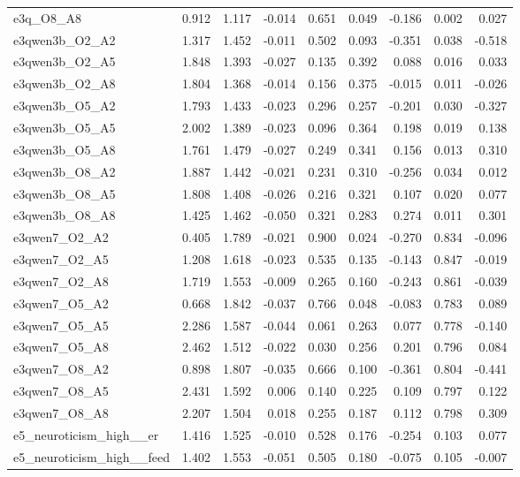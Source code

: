 \documentclass[11pt]{article}
\begin{document}
\begin{landscape}
\begin{longtable}{@{}lrrrrrrrr@{}}
e3q\_O8\_A8 & 0.912 & 1.117 & -0.014 & 0.651 & 0.049 & -0.186 & 0.002 & 0.027 \\
e3qwen3b\_O2\_A2 & 1.317 & 1.452 & -0.011 & 0.502 & 0.093 & -0.351 & 0.038 & -0.518 \\
e3qwen3b\_O2\_A5 & 1.848 & 1.393 & -0.027 & 0.135 & 0.392 & 0.088 & 0.016 & 0.033 \\
e3qwen3b\_O2\_A8 & 1.804 & 1.368 & -0.014 & 0.156 & 0.375 & -0.015 & 0.011 & -0.026 \\
e3qwen3b\_O5\_A2 & 1.793 & 1.433 & -0.023 & 0.296 & 0.257 & -0.201 & 0.030 & -0.327 \\
e3qwen3b\_O5\_A5 & 2.002 & 1.389 & -0.023 & 0.096 & 0.364 & 0.198 & 0.019 & 0.138 \\
e3qwen3b\_O5\_A8 & 1.761 & 1.479 & -0.027 & 0.249 & 0.341 & 0.156 & 0.013 & 0.310 \\
e3qwen3b\_O8\_A2 & 1.887 & 1.442 & -0.021 & 0.231 & 0.310 & -0.256 & 0.034 & 0.012 \\
e3qwen3b\_O8\_A5 & 1.808 & 1.408 & -0.026 & 0.216 & 0.321 & 0.107 & 0.020 & 0.077 \\
e3qwen3b\_O8\_A8 & 1.425 & 1.462 & -0.050 & 0.321 & 0.283 & 0.274 & 0.011 & 0.301 \\
e3qwen7\_O2\_A2 & 0.405 & 1.789 & -0.021 & 0.900 & 0.024 & -0.270 & 0.834 & -0.096 \\
e3qwen7\_O2\_A5 & 1.208 & 1.618 & -0.023 & 0.535 & 0.135 & -0.143 & 0.847 & -0.019 \\
e3qwen7\_O2\_A8 & 1.719 & 1.553 & -0.009 & 0.265 & 0.160 & -0.243 & 0.861 & -0.039 \\
e3qwen7\_O5\_A2 & 0.668 & 1.842 & -0.037 & 0.766 & 0.048 & -0.083 & 0.783 & 0.089 \\
e3qwen7\_O5\_A5 & 2.286 & 1.587 & -0.044 & 0.061 & 0.263 & 0.077 & 0.778 & -0.140 \\
e3qwen7\_O5\_A8 & 2.462 & 1.512 & -0.022 & 0.030 & 0.256 & 0.201 & 0.796 & 0.084 \\
e3qwen7\_O8\_A2 & 0.898 & 1.807 & -0.035 & 0.666 & 0.100 & -0.361 & 0.804 & -0.441 \\
e3qwen7\_O8\_A5 & 2.431 & 1.592 & 0.006 & 0.140 & 0.225 & 0.109 & 0.797 & 0.122 \\
e3qwen7\_O8\_A8 & 2.207 & 1.504 & 0.018 & 0.255 & 0.187 & 0.112 & 0.798 & 0.309 \\
e5\_neuroticism\_high\_\_er & 1.416 & 1.525 & -0.010 & 0.528 & 0.176 & -0.254 & 0.103 & 0.077 \\
e5\_neuroticism\_high\_\_feed & 1.402 & 1.553 & -0.051 & 0.505 & 0.180 & -0.075 & 0.105 & -0.007 \\

\end{longtable}
\end{landscape}
\end{document}
